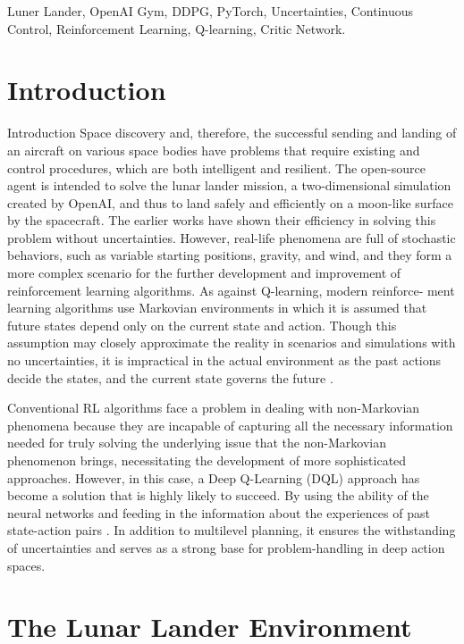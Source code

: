 \documentclass[conference]{IEEEtran}
\begin{document}
\begin{IEEEkeywords}
Luner Lander, OpenAI Gym, DDPG, PyTorch, Uncertainties, Continuous Control, Reinforcement Learning, Q-learning, Critic Network.
\end{IEEEkeywords}


\section{Introduction}
Introduction Space discovery and, therefore, the successful
sending and landing of an aircraft on various space bodies have
problems that require existing and control procedures, which
are both intelligent and resilient. The open-source agent is
intended to solve the lunar lander mission, a two-dimensional
simulation created by OpenAI, and thus to land safely and
efficiently on a moon-like surface by the spacecraft. The earlier
works have shown their efficiency in solving this problem
without uncertainties. However, real-life phenomena are full
of stochastic behaviors, such as variable starting positions,
gravity, and wind, and they form a more complex scenario
for the further development and improvement of reinforcement
learning algorithms. As against Q-learning, modern reinforce-
ment learning algorithms use Markovian environments in
which it is assumed that future states depend only on the
current state and action. Though this assumption may closely
approximate the reality in scenarios and simulations with no
uncertainties, it is impractical in the actual environment as the
past actions decide the states, and the current state governs the
future \cite{parsons2015virtual}.

Conventional RL algorithms face a problem in dealing with non-Markovian phenomena because they are incapable of capturing all the necessary information needed for truly solving the underlying issue that the non-Markovian phenomenon brings, necessitating the development of more sophisticated approaches. However, in this case, a Deep Q-Learning (DQL) approach has become a solution that is highly likely to succeed. By using the ability of the neural networks and feeding in the information about the experiences of past state-action pairs \cite{candadai2020sources}. In addition to multilevel planning, it ensures the withstanding of uncertainties and serves as a strong base for problem-handling in deep action spaces.
 
\section{The Lunar Lander Environment}
\end{document}
